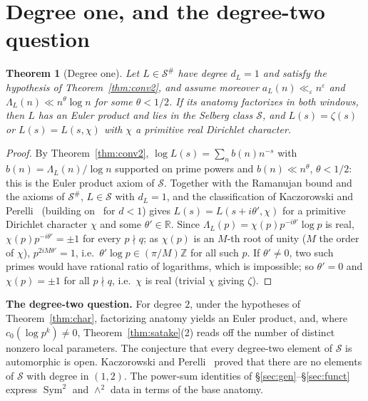 \documentclass[11pt]{amsart}
\newtheorem{theorem}{Theorem}[section]
\theoremstyle{definition}
\theoremstyle{remark}
\newcommand{\cS}{\mathcal S}
\DeclareMathOperator{\Sym}{Sym}
\begin{document}
\section{\texorpdfstring{Degree one, and the degree-two question}{Degree one, and the degree-two question}}\label{sec:auto2}
\begin{theorem}[Degree one]\label{thm:gl1}
Let $L\in\cS^\#$ have degree $d_L=1$ and satisfy the hypothesis of
Theorem~\ref{thm:conv2}, and assume moreover $a_L(n)\ll_\varepsilon n^{\varepsilon}$
and $\Lambda_L(n)\ll n^{\theta}\log n$ for some $\theta<1/2$. If its anatomy factorizes in both windows, then $L$ has an Euler
product and lies in the Selberg class $\cS$, and $L(s)=\zeta(s)$ or $L(s)=L(s,\chi)$ with $\chi$ a primitive real
Dirichlet character.
\end{theorem}
\begin{proof}
By Theorem~\ref{thm:conv2}, $\log L(s)=\sum_nb(n)n^{-s}$ with
$b(n)=\Lambda_L(n)/\log n$ supported on prime powers and $b(n)\ll n^{\theta}$,
$\theta<1/2$: this is the Euler product axiom of $\cS$. Together with the
Ramanujan bound and the axioms of $\cS^\#$, $L\in\cS$ with $d_L=1$, and the classification of Kaczorowski and Perelli~\cite{KP1}
(building on~\cite{CG} for $d<1$) gives $L(s)=L(s+i\theta',\chi)$ for a
primitive Dirichlet character $\chi$ and some $\theta'\in\mathbb R$. Since
$\Lambda_L(p)=\chi(p)p^{-i\theta'}\log p$ is real, $\chi(p)p^{-i\theta'}=\pm1$ for
every $p\nmid q$; as $\chi(p)$ is an $M$-th root of unity ($M$ the order of
$\chi$), $p^{2iM\theta'}=1$, i.e.\ $\theta'\log p\in(\pi/M)\mathbb Z$ for all
such $p$. If $\theta'\ne0$, two such primes would have rational ratio of
logarithms, which is impossible; so $\theta'=0$ and $\chi(p)=\pm1$ for all
$p\nmid q$, i.e.\ $\chi$ is real (trivial $\chi$ giving $\zeta$).
\end{proof}

\noindent\textbf{The degree-two question.} For degree $2$, under the hypotheses
of Theorem~\ref{thm:char}, factorizing anatomy yields an Euler product, and,
where $c_0(\log p^k)\ne0$, Theorem~\ref{thm:satake}(2) reads off the number of
distinct nonzero local parameters. The conjecture that every degree-two element
of $\cS$ is automorphic is open. Kaczorowski and Perelli~\cite{KP7} proved that there are
no elements of $\cS$ with degree in $(1,2)$. The power-sum identities of
\S\ref{sec:gen}--\S\ref{sec:funct} express $\Sym^2$ and $\wedge^2$ data in terms
of the base anatomy.
\end{document}
